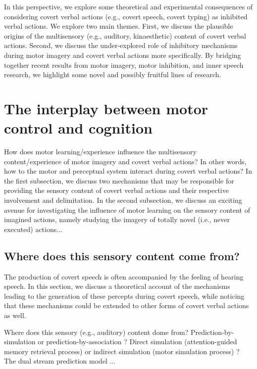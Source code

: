 \documentclass[utf8]{template/frontiersSCNS} %
\begin{document}
In this perspective, we explore some theoretical and experimental consequences of considering covert verbal actions (e.g., covert speech, covert typing) as inhibited verbal actions. We explore two main themes. First, we discuss the plausible origins of the multisensory (e.g., auditory, kinaesthetic) content of covert verbal actions. Second, we discuss the under-explored role of inhibitory mechanisms during motor imagery and covert verbal actions more specifically. By bridging together recent results from motor imagery, motor inhibition, and inner speech research, we highlight some novel and possibly fruitful lines of research.

\section{The interplay between motor control and cognition}

How does motor learning/experience influence the multisensory content/experience of motor imagery and covert verbal actions? In other words, how to the motor and perceptual system interact during covert verbal actions? In the first subsection, we discuss two mechanisms that may be responsible for providing the sensory content of covert verbal actions and their respective involvement and delimitation. In the second subsection, we discuss an exciting avenue for investigating the influence of motor learning on the sensory content of imagined actions, namely studying the imagery of totally novel (i.e., never executed) actions...

\subsection{Where does this sensory content come from?}

The production of covert speech is often accompanied by the feeling of hearing speech. In this section, we discuss a theoretical account of the mechanisms leading to the generation of these percepts during covert speech, while noticing that these mechanisms could be extended to other forms of covert verbal actions as well.

Where does this sensory (e.g., auditory) content dome from? Prediction-by-simulation or prediction-by-association \citep{pickering_integrated_2013}? Direct simulation (attention-guided memory retrieval process) or indirect simulation (motor simulation process) \citep{tian_mental_2012, tian_effect_2013, li_corollary_2020, ma_distinct_2019}? The dual stream prediction model \citep{tian_mental_2016}...
\end{document}

